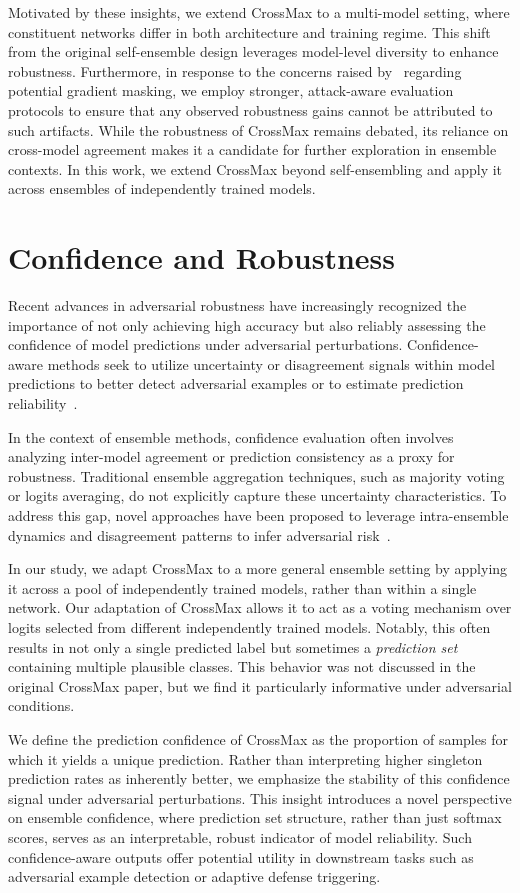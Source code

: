 Motivated by these insights, we extend CrossMax to a multi-model setting, where constituent networks differ in both architecture and training regime. This shift from the original self-ensemble design leverages model-level diversity to enhance robustness. Furthermore, in response to the concerns raised by~\cite{zhang2024evaluating} regarding potential gradient masking, we employ stronger, attack-aware evaluation protocols to ensure that any observed robustness gains cannot be attributed to such artifacts. While the robustness of CrossMax remains debated, its reliance on cross-model agreement makes it a candidate for further exploration in ensemble contexts. In this work, we extend CrossMax beyond self-ensembling and apply it across ensembles of independently trained models.




\section{Confidence and Robustness}
\indent

Recent advances in adversarial robustness have increasingly recognized the importance of not only achieving high accuracy but also reliably assessing the confidence of model predictions under adversarial perturbations. Confidence-aware methods seek to utilize uncertainty or disagreement signals within model predictions to better detect adversarial examples or to estimate prediction reliability~\cite{gal2016dropout}.

In the context of ensemble methods, confidence evaluation often involves analyzing inter-model agreement or prediction consistency as a proxy for robustness. Traditional ensemble aggregation techniques, such as majority voting or logits averaging, do not explicitly capture these uncertainty characteristics. To address this gap, novel approaches have been proposed to leverage intra-ensemble dynamics and disagreement patterns to infer adversarial risk~\cite{pang2019improving, abbasi2017robustness}.

In our study, we adapt CrossMax to a more general ensemble setting by applying it across a pool of independently trained models, rather than within a single network. Our adaptation of CrossMax allows it to act as a voting mechanism over logits selected from different independently trained models. Notably, this often results in not only a single predicted label but sometimes a \textit{prediction set} containing multiple plausible classes. This behavior was not discussed in the original CrossMax paper, but we find it particularly informative under adversarial conditions.

We define the prediction confidence of CrossMax as the proportion of samples for which it yields a unique prediction. Rather than interpreting higher singleton prediction rates as inherently better, we emphasize the stability of this confidence signal under adversarial perturbations. This insight introduces a novel perspective on ensemble confidence, where prediction set structure, rather than just softmax scores, serves as an interpretable, robust indicator of model reliability. Such confidence-aware outputs offer potential utility in downstream tasks such as adversarial example detection or adaptive defense triggering.